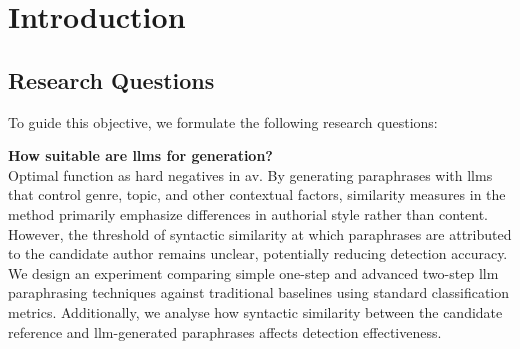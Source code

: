 \chapter{Introduction}
\label{chap:introduction}





\section{Research Questions}
\label{sec:research_questions}
To guide this objective, we formulate the following research questions:
\begin{questions}
    \item \textbf{How suitable are \acp{llm} for \imp{} generation?} \label{enum:rq1} \hfill \\
    Optimal \imps{} function as hard negatives in \ac{av}.
    By generating paraphrases with \acp{llm} that control genre, topic, and other contextual factors, similarity measures in the \imp{} method primarily emphasize differences in authorial style rather than content.
    However, the threshold of syntactic similarity at which paraphrases are attributed to the candidate author remains unclear, potentially reducing detection accuracy.
    We design an experiment comparing simple one-step and advanced two-step \ac{llm} paraphrasing techniques against traditional baselines using standard classification metrics.
    Additionally, we analyse how syntactic similarity between the candidate reference and \ac{llm}-generated paraphrases affects detection effectiveness.


\end{questions}
